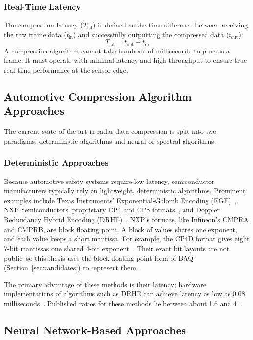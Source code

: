\subsubsection{Real-Time Latency}
The compression latency ($T_{\text{lat}}$) is defined as the time difference between receiving the raw frame data ($t_{\text{in}}$) and successfully outputting the compressed data ($t_{\text{out}}$):
\begin{equation}
\label{eq:latency}
    T_{\text{lat}} = t_{\text{out}} - t_{\text{in}}
\end{equation}
A compression algorithm cannot take hundreds of milliseconds to process a frame. It must operate with minimal latency and high throughput to ensure true real-time performance at the sensor edge.

\subsection{Automotive Compression Algorithm Approaches}

The current state of the art in radar data compression is split into two paradigms: deterministic algorithms and neural or spectral algorithms.

\subsubsection{Deterministic Approaches}
Because automotive safety systems require low latency, semiconductor manufacturers typically rely on lightweight, deterministic algorithms. Prominent examples include Texas Instruments' Exponential-Golomb Encoding (EGE)~\cite{ti_ege}, NXP Semiconductors' proprietary CP4 and CP8 formats~\cite{nxp_an5375}, and Doppler Redundancy Hybrid Encoding (DRHE)~\cite{zivkovic2015}.
NXP's formats, like Infineon's CMPRA and CMPRB, are block floating point. A
block of values shares one exponent, and each value keeps a short mantissa. For
example, the CP4D format gives eight 7-bit mantissas one shared 4-bit
exponent~\cite{nxp_an5375}. Their exact bit layouts are not public, so this
thesis uses the block floating point form of BAQ
(Section~\ref{sec:candidates}) to represent them.

The primary advantage of these methods is their latency; hardware implementations of algorithms such as DRHE can achieve latency as low as 0.08 milliseconds~\cite{kiem2025}. Published ratios for these methods lie between about 1.6 and 4~\cite{ti_ege,nxp_an5375,kiem2025}.

\subsection{Neural Network-Based Approaches}

